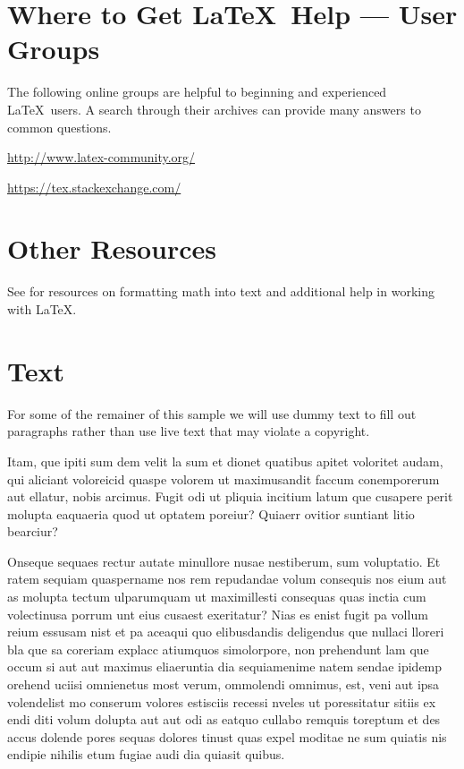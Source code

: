 \documentclass[lettersize,journal]{IEEEtran}
\begin{document}
\section{Where to Get \LaTeX \ Help --- User Groups}
The following online groups are helpful to beginning and experienced \LaTeX\ users. A search through their archives can provide many answers to common questions.
\begin{list}{}{}
\item{\url{http://www.latex-community.org/}} 
\item{\url{https://tex.stackexchange.com/} }
\end{list}

\section{Other Resources}
See \cite{ref1,ref2,ref3,ref4,ref5} for resources on formatting math into text and additional help in working with \LaTeX .

\section{Text}
For some of the remainer of this sample we will use dummy text to fill out paragraphs rather than use live text that may violate a copyright.

Itam, que ipiti sum dem velit la sum et dionet quatibus apitet voloritet audam, qui aliciant voloreicid quaspe volorem ut maximusandit faccum conemporerum aut ellatur, nobis arcimus.
Fugit odi ut pliquia incitium latum que cusapere perit molupta eaquaeria quod ut optatem poreiur? Quiaerr ovitior suntiant litio bearciur?

Onseque sequaes rectur autate minullore nusae nestiberum, sum voluptatio. Et ratem sequiam quaspername nos rem repudandae volum consequis nos eium aut as molupta tectum ulparumquam ut maximillesti consequas quas inctia cum volectinusa porrum unt eius cusaest exeritatur? Nias es enist fugit pa vollum reium essusam nist et pa aceaqui quo elibusdandis deligendus que nullaci lloreri bla que sa coreriam explacc atiumquos simolorpore, non prehendunt lam que occum\cite{doppler2009device} si aut aut maximus eliaeruntia dia sequiamenime natem sendae ipidemp orehend uciisi omnienetus most verum, ommolendi omnimus, est, veni aut ipsa volendelist mo conserum volores estisciis recessi nveles ut poressitatur sitiis ex endi diti volum dolupta aut aut odi as eatquo cullabo remquis toreptum et des accus dolende pores sequas dolores tinust quas expel moditae ne sum quiatis nis endipie nihilis etum fugiae audi dia quiasit quibus.
\end{document}
